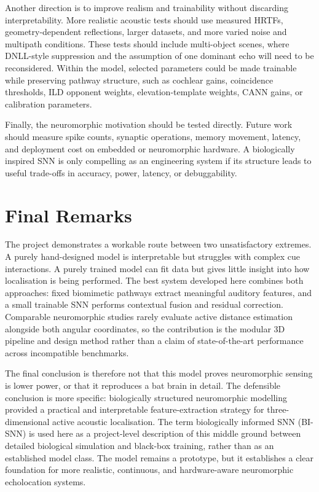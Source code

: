 Another direction is to improve realism and trainability without discarding interpretability. More realistic acoustic tests should use measured HRTFs, geometry-dependent reflections, larger datasets, and more varied noise and multipath conditions. These tests should include multi-object scenes, where DNLL-style suppression and the assumption of one dominant echo will need to be reconsidered. Within the model, selected parameters could be made trainable while preserving pathway structure, such as cochlear gains, coincidence thresholds, ILD opponent weights, elevation-template weights, CANN gains, or calibration parameters.

Finally, the neuromorphic motivation should be tested directly. Future work should measure spike counts, synaptic operations, memory movement, latency, and deployment cost on embedded or neuromorphic hardware. A biologically inspired SNN is only compelling as an engineering system if its structure leads to useful trade-offs in accuracy, power, latency, or debuggability.

\section{Final Remarks}

The project demonstrates a workable route between two unsatisfactory extremes. A purely hand-designed model is interpretable but struggles with complex cue interactions. A purely trained model can fit data but gives little insight into how localisation is being performed. The best system developed here combines both approaches: fixed biomimetic pathways extract meaningful auditory features, and a small trainable SNN performs contextual fusion and residual correction. Comparable neuromorphic studies rarely evaluate active distance estimation alongside both angular coordinates, so the contribution is the modular 3D pipeline and design method rather than a claim of state-of-the-art performance across incompatible benchmarks.

The final conclusion is therefore not that this model proves neuromorphic sensing is lower power, or that it reproduces a bat brain in detail. The defensible conclusion is more specific: biologically structured neuromorphic modelling provided a practical and interpretable feature-extraction strategy for three-dimensional active acoustic localisation. The term biologically informed SNN (BI-SNN) is used here as a project-level description of this middle ground between detailed biological simulation and black-box training, rather than as an established model class. The model remains a prototype, but it establishes a clear foundation for more realistic, continuous, and hardware-aware neuromorphic echolocation systems.
